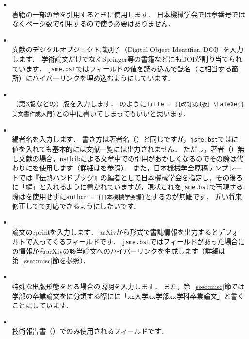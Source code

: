 \documentclass[a4paper,fleqn,uplatex,dvipdfmx]{jsarticle}
\newcommand{\jsmefile}{\texttt{jsme.bst}}
\begin{document}
\begin{itemize}
    \item \ttchapter \\
        書籍の一部の章を引用するときに使用します．
        日本機械学会では章番号ではなくページ数で引用するので使う必要はありません．
    \item \ttdoi \\
        文献のデジタルオブジェクト識別子（Digital Object Identifier, DOI）を入力します．
        学術論文だけでなくSpringer等の書籍などにもDOIが割り当てられています．
        \jsmefile では\ttdoi フィールドの値を読み込んで誌名（に相当する箇所）にハイパーリンクを埋め込むようにしています．
    \item \ttedition \\
        （第3版などの）版を入力します．
        \citet{奥村:技評2020}のように\verb|title = {［改訂第8版］\LaTeXe{}美文書作成入門}|と\tttitle の中に書いてしまってもいいと思います．
    \item \tteditor \\
        編者名を入力します．
        書き方は著者名（\ttauthor）と同じですが，\jsmefile では\tteditor に値を入れても基本的には文献一覧には出力されません．
        ただし，著者（\ttauthor）無し文献の場合，\verb|natbib|による文章中での引用がおかしくなるのでその際は\ttauthor 代わりに\tteditor を使用します（詳細は\hyperref[ssec:proceedings]{\ttproceedings}を参照）．
        また，日本機械学会原稿テンプレートでは『伝熱ハンドブック』の編者として日本機械学会を指定し，その後ろに「編」と入れるように書かれていますが，現状これを\jsmefile で再現する際は\tteditor を使用せずに\verb|author = {日本機械学会編}|とするのが無難です．
        近い将来修正して\tteditor で対応できるようにしたいです．
    \item \tteprint \\
        論文のeprintを入力します．
        arXivから\BibTeX{}形式で書誌情報を出力するとデフォルトで入ってくるフィールドです．
        \jsmefile では\ttarchivePrefix フィールドがあった場合に\tteprint の情報からarXivの該当論文へのハイパーリンクを生成します（詳細は第~\ref{ssec:misc}節\ttmisc を参照）．
    \item \tthowpublished \\
        特殊な出版形態をとる場合の説明を入力します．
        また，第~\ref{ssec:misc}節では学部の卒業論文を\ttmisc に分類する際に\tthowpublished に「xx大学xx学部xx学科卒業論文」と書くことにしています．
    \item \ttinstitution \\
        技術報告書（\hyperref[ssec:techreport]{\tttechreport}）でのみ使用されるフィールドです．

\end{itemize}
\end{document}
